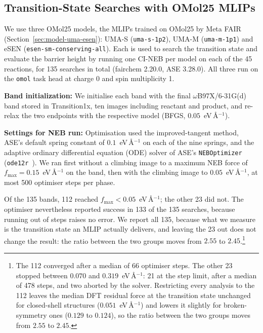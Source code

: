 \subsection{Transition-State Searches with OMol25 MLIPs}
\label{sec:neb}

We use three OMol25 models, the MLIPs trained on OMol25 by Meta FAIR
(Section~\ref{sec:model-uma-esen}): UMA-S (\texttt{uma-s-1p2}), UMA-M
(\texttt{uma-m-1p1}) and eSEN (\texttt{esen-sm-conserving-all}). Each
is used to search the transition state and evaluate the barrier height by running one CI-NEB per model on each of the
45 reactions, for 135 searches in total (fairchem 2.20.0, ASE 3.28.0). All three
run on the \texttt{omol} task head at charge 0 and spin multiplicity 1. %

\textbf{Band initialization:} We initialise each band with the final \mbox{$\omega$B97X/6-31G(d)} band stored in
Transition1x, ten images including reactant and product, and re-relax the two
endpoints with the respective model (BFGS, $0.05$~eV\,\AA$^{-1}$).

\textbf{Settings for NEB run:} Optimisation used the improved-tangent method, ASE's default spring constant of
$0.1$~eV\,\AA$^{-1}$ on each of the nine springs, and the adaptive ordinary
differential equation (ODE) solver of ASE's \texttt{NEBOptimizer}
(\texttt{ode12r}~\cite{makri2019preconditioning}). We ran first without a
climbing image to a maximum NEB force of $f_\mathrm{max} = 0.15$~eV\,\AA$^{-1}$ on the band,
then with the climbing image to $0.05$~eV\,\AA$^{-1}$, at most 500 optimiser
steps per phase.



Of the 135 bands, 112 reached $f_\mathrm{max} < 0.05$~eV\,\AA$^{-1}$;
the other 23 did not. The optimiser nevertheless reported success in
133 of the 135 searches, because running out of steps raises no
error. We report all 135, because what we measure is the transition
state an MLIP actually delivers, and leaving the 23 out does not
change the result: the ratio between the two groups moves from $2.55$
to $2.45$.\footnote{The 112 converged after a
median of 66 optimiser steps. The other 23 stopped between $0.070$
and $0.319$~eV\,\AA$^{-1}$: 21 at the step limit, after a median of
478 steps, and two aborted by the solver. Restricting every analysis
to the 112 leaves the median DFT residual force at the transition state
unchanged for closed-shell structures ($0.051$~eV\,\AA$^{-1}$) and lowers it
slightly for broken-symmetry ones ($0.129$ to $0.124$), so the ratio between the
two groups moves from $2.55$ to $2.45$.}


